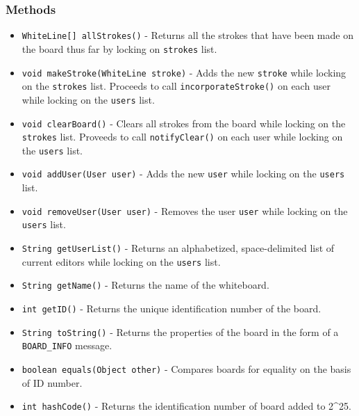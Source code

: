 \subsubsection{Methods}
\begin{itemize}
\item \texttt{WhiteLine[] allStrokes()} - Returns all the strokes that have been made on the board thus far by locking on \texttt{strokes} list.
\item \texttt{void makeStroke(WhiteLine stroke)} - Adds the new \texttt{stroke} while locking on the \texttt{strokes} list. Proceeds to call \texttt{incorporateStroke()} on each user while locking on the \texttt{users} list.
\item \texttt{void clearBoard()} - Clears all strokes from the board while locking on the \texttt{strokes} list. Proveeds to call \texttt{notifyClear()} on each user while locking on the \texttt{users} list.
\item \texttt{void addUser(User user)} - Adds the new \texttt{user} while locking on the \texttt{users} list.
\item \texttt{void removeUser(User user)} - Removes the user \texttt{user} while locking on the \texttt{users} list.
\item \texttt{String getUserList()} - Returns an alphabetized, space-delimited list of current editors while locking on the \texttt{users} list.
\item \texttt{String getName()} - Returns the name of the whiteboard.
\item \texttt{int getID()} - Returns the unique identification number of the board.
\item \texttt{String toString()} - Returns the properties of the board in the form of a \texttt{BOARD\_INFO} message.
\item \texttt{boolean equals(Object other)} - Compares boards for equality on the basis of ID number.
\item \texttt{int hashCode()} - Returns the identification number of board added to 2^{25}.
\end{itemize}

